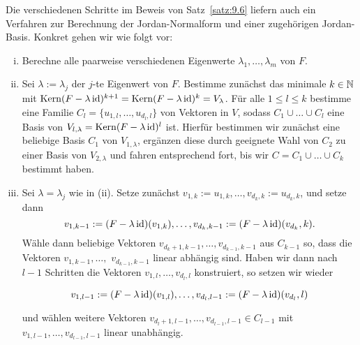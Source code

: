 \begin{bemerkung}
	\label{bem:9.19}
	Die verschiedenen Schritte im Beweis von Satz~\ref{satz:9.6} liefern auch ein Verfahren zur Berechnung der Jordan-Normalform und einer zugehörigen Jordan-Basis.
	Konkret gehen wir wie folgt vor:
	\begin{enumerate}[(i)]
		\item Berechne alle paarweise verschiedenen Eigenwerte $\lambda_1,\dots,\lambda_m$ von $F$.
		\item Sei $\lambda := \lambda_j$ der $j$-te Eigenwert von $F$.
		Bestimme zunächst das minimale $k \in \mathbb{N}$ mit $\operatorname{Kern}(F-\lambda \operatorname{id})^{k+1} = \operatorname{Kern}(F-\lambda \operatorname{id})^k = V_\lambda$.
		Für alle $1 \leq l \leq k$ bestimme eine Familie $C_l = \{u_{1,l},\dots,u_{d_l,l}\}$ von Vektoren in $V$, sodass $C_1 \cup \dots \cup C_l$ eine Basis von $V_{l,\lambda} = \operatorname{Kern}(F-\lambda \operatorname{id})^l$ ist.
		Hierfür bestimmen wir zunächst eine beliebige Basis $C_1$ von $V_{1,\lambda}$, ergänzen diese durch geeignete Wahl von $C_2$ zu einer Basis von $V_{2,\lambda}$ und fahren entsprechend fort, bis wir $C = C_1 \cup \dots \cup C_k$ bestimmt haben.
		\item Sei $\lambda = \lambda_j$ wie in (ii).
		Setze zunächst $v_{1,k} := u_{1,k}, \dots, v_{d_k,k} := u_{d_k,k}$, und setze dann
		\[
			v_{1,{k-1}} := (F-  \lambda \operatorname{id})(v_{1,k}), \dots, v_{d_k,k-1} := (F-\lambda \operatorname{id})(v_{d_k},k).
		\]
		Wähle dann beliebige Vektoren $v_{d_k+1,k-1}, \dots, v_{d_{k-1},k-1}$ aus $C_{k-1}$ so, dass die Vektoren $v_{1,k-1},\dots,$ \linebreak $v_{d_{k-1},k-1}$ linear abhängig sind.
		Haben wir dann nach $l-1$ Schritten die Vektoren $v_{1,l},\dots,v_{d_l,l}$ konstruiert, so setzen wir wieder
		
		\[
			v_{1,l-1} := (F-\lambda \operatorname{id})(v_{1,l}), \dots, v_{d_l,l-1} := (F-\lambda\operatorname{id})(v_{d_l},l)
		\]
		
		und wählen weitere Vektoren $v_{d_l+1,l-1}, \dots, v_{d_{l-1},l-1} \in C_{l-1}$ mit $v_{1,l-1},\dots,v_{d_{l-1},l-1}$ linear unabhängig.
		

\end{enumerate}
\end{bemerkung}
